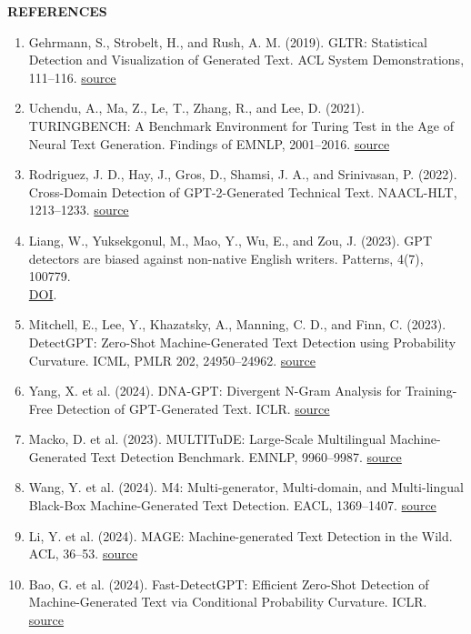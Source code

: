 \documentclass[12pt,a4paper]{article}
\begin{document}
\clearpage\begin{center}{\bfseries\fontsize{16}{20}\selectfont REFERENCES}\end{center}
{\small\sloppy\begin{enumerate}[leftmargin=*,itemsep=1pt]
\item Gehrmann, S., Strobelt, H., and Rush, A. M. (2019). GLTR: Statistical Detection and Visualization of Generated Text. ACL System Demonstrations, 111--116. \href{https://aclanthology.org/P19-3019/}{source}
\item Uchendu, A., Ma, Z., Le, T., Zhang, R., and Lee, D. (2021). TURINGBENCH: A Benchmark Environment for Turing Test in the Age of Neural Text Generation. Findings of EMNLP, 2001--2016. \href{https://aclanthology.org/2021.findings-emnlp.172/}{source}
\item Rodriguez, J. D., Hay, J., Gros, D., Shamsi, J. A., and Srinivasan, P. (2022). Cross-Domain Detection of GPT-2-Generated Technical Text. NAACL-HLT, 1213--1233. \href{https://aclanthology.org/2022.naacl-main.88/}{source}
\item Liang, W., Yuksekgonul, M., Mao, Y., Wu, E., and Zou, J. (2023). GPT detectors are biased against non-native English writers. Patterns, 4(7), 100779. \\\href{https://doi.org/10.1016/j.patter.2023.100779}{DOI}.
\item Mitchell, E., Lee, Y., Khazatsky, A., Manning, C. D., and Finn, C. (2023). DetectGPT: Zero-Shot Machine-Generated Text Detection using Probability Curvature. ICML, PMLR 202, 24950--24962. \href{https://proceedings.mlr.press/v202/mitchell23a.html}{source}
\item Yang, X. et al. (2024). DNA-GPT: Divergent N-Gram Analysis for Training-Free Detection of GPT-Generated Text. ICLR. \href{https://arxiv.org/abs/2305.17359}{source}
\item Macko, D. et al. (2023). MULTITuDE: Large-Scale Multilingual Machine-Generated Text Detection Benchmark. EMNLP, 9960--9987. \href{https://aclanthology.org/2023.emnlp-main.616/}{source}
\item Wang, Y. et al. (2024). M4: Multi-generator, Multi-domain, and Multi-lingual Black-Box Machine-Generated Text Detection. EACL, 1369--1407. \href{https://aclanthology.org/2024.eacl-long.83/}{source}
\item Li, Y. et al. (2024). MAGE: Machine-generated Text Detection in the Wild. ACL, 36--53. \href{https://aclanthology.org/2024.acl-long.3/}{source}
\item Bao, G. et al. (2024). Fast-DetectGPT: Efficient Zero-Shot Detection of Machine-Generated Text via Conditional Probability Curvature. ICLR. \href{https://proceedings.iclr.cc/paper_files/paper/2024/file/6b8c6f846c3575e1d1ad496abea28826-Abstract-Conference.html}{source}

\end{enumerate}}
\end{document}
